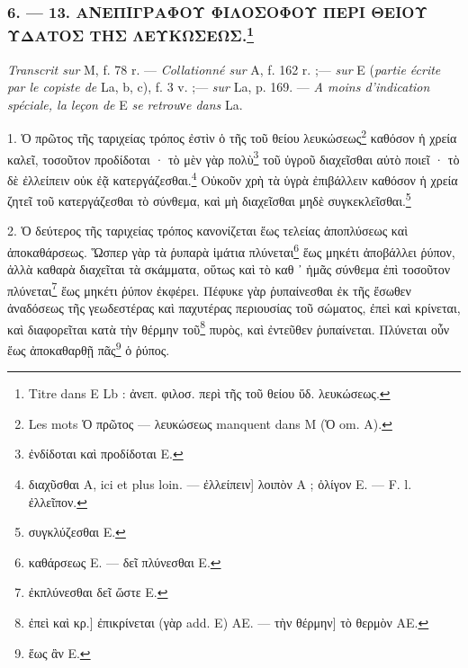 \documentclass[a4paper, 11pt, oneside, polutonikogreek, french]{article}
\begin{document}
\bigskip
\centerline{\EightStarTaper}
\centerline{\EightStarTaper\EightStarTaper}
\bigskip

\subsubsection[6. --- 13. ΑΝΕΠΙΓΡΑΦΟΥ ΦΙΛΟΣΟΦΟΥ ΠΕΡΙ ΘΕΙΟΥ ΥΔΑΤΟΣ ΤΗΣ ΛΕΥΚΩΣΕΩΣ.]{6. --- 13. ΑΝΕΠΙΓΡΑΦΟΥ ΦΙΛΟΣΟΦΟΥ ΠΕΡΙ ΘΕΙΟΥ ΥΔΑΤΟΣ ΤΗΣ ΛΕΥΚΩΣΕΩΣ.\footnote{Titre dans E Lb : ἀνεπ. φιλοσ. περὶ τῆς τοῦ θείου ὕδ. λευκώσεως.}}

\emph{Transcrit sur} M, f. 78 r. --- \emph{Collationné sur} A, f. 162 r. ;--- \emph{sur} E (\emph{partie écrite par le copiste de} La, b, c), f. 3 v. ;--- \emph{sur} La, p. 169. --- \emph{A moins d'indication spéciale, la leçon de} E \emph{se retrouνe dans} La.

\bigskip

1. Ὁ πρῶτος τῆς ταριχείας τρόπος ἐστὶν ὁ τῆς τοῦ θείου λευκώσεως\footnote{Les mots Ὁ πρῶτος --- λευκώσεως manquent dans M (Ὁ om. A).} καθόσον ἡ χρεία καλεῖ, τοσοῦτον προδίδοται · τὸ μὲν γὰρ πολὺ\footnote{ἐνδίδοται καὶ προδίδοται E.} τοῦ ὑγροῦ διαχεῖσθαι αὐτὸ ποιεῖ · τὸ δὲ ἐλλείπειν οὐκ ἐᾷ κατεργάζεσθαι.\footnote{διαχῦσθαι A, ici et plus loin. --- ἐλλείπειν] λοιπὸν A ; ὀλίγον E. --- F. l. ἐλλεῖπον.} Οὐκοῦν χρὴ τὰ ὑγρὰ ἐπιβάλλειν καθόσον ἡ χρεία ζητεῖ τοῦ κατεργάζεσθαι τὸ σύνθεμα, καὶ μὴ διαχεῖσθαι μηδὲ συγκεκλεῖσθαι.\footnote{συγκλύζεσθαι E.}

2. Ὁ δεύτερος τῆς ταριχείας τρόπος κανονίζεται ἕως τελείας ἀποπλύσεως καὶ ἀποκαθάρσεως. Ὥσπερ γὰρ τὰ ῥυπαρὰ ἱμάτια πλύνεται\footnote{καθάρσεως E. --- δεῖ πλύνεσθαι E.} ἕως μηκέτι ἀποβάλλει ῥύπον, ἀλλὰ καθαρὰ διαχεῖται τὰ σκάμματα, οὕτως καὶ τὸ καθ ᾽ ἡμᾶς σύνθεμα ἐπὶ τοσοῦτον πλύνεται\footnote{ἐκπλύνεσθαι δεῖ ὥστε E.} ἕως μηκέτι ῥύπον ἐκφέρει. Πέφυκε γὰρ ῥυπαίνεσθαι ἐκ τῆς ἔσωθεν ἀναδόσεως τῆς γεωδεστέρας καὶ παχυτέρας περιουσίας τοῦ σώματος, ἐπεὶ καὶ κρίνεται, καὶ διαφορεῖται κατὰ τὴν θέρμην τοῦ\footnote{ἐπεὶ καὶ κρ.] ἐπικρίνεται (γὰρ add. E) AE. --- τὴν θέρμην] τὸ θερμὸν AE.} πυρὸς, καὶ ἐντεῦθεν ῥυπαίνεται. Πλύνεται οὖν ἕως ἀποκαθαρθῇ πᾶς\footnote{ἕως ἂν E.} ὁ ῥύπος.
\end{document}
